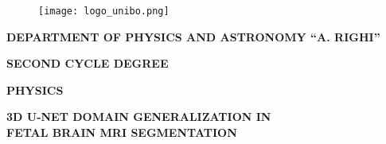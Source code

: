 \documentclass[12pt,a4paper]{report}
\begin{document}
\begin{titlepage}
        \thispagestyle{fancy}
    \begin{figure}[h]
        \vspace{-0.5cm} %
        \centering
        \texttt{[image: logo\_unibo.png]}
    \end{figure}

    \vspace{3mm}

    \begin{center}
        \bf {DEPARTMENT OF PHYSICS AND ASTRONOMY ``A. RIGHI''}
    \end{center}

    \begin{center}
        \bf \large{SECOND CYCLE DEGREE}

        \bf \large{PHYSICS}
    \end{center}

    \vspace{15mm}

    \begin{center}
        {\huge{\bf 3D U-NET DOMAIN GENERALIZATION IN}}
        \vspace{15pt}\\
        {\huge{\bf FETAL BRAIN MRI SEGMENTATION}}
    \end{center}

    \vspace{50mm} \par \noindent


\end{titlepage}
\end{document}
